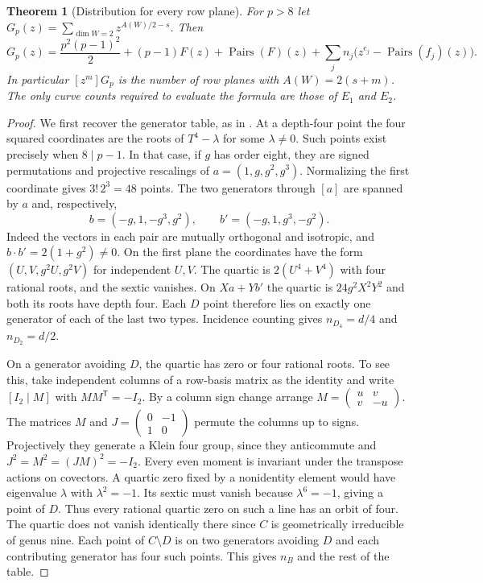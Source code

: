 \documentclass[11pt]{article}
\newtheorem{theorem}{Theorem}[section]
\newcommand{\sq}{\operatorname{Pairs}}
\begin{document}
\begin{theorem}[Distribution for every row plane]\label{th:all}
For $p>8$ let $G_p(z)=\sum_{\dim W=2}z^{A(W)/2-s}$. Then
\begin{equation}\label{eq:census}
 G_p(z)=\frac{p^2(p-1)^2}{2}+(p-1)F(z)+\sq(F)(z)
       +\sum_j n_j\big(z^{e_j}-\sq(f_j)(z)\big).
\end{equation}
In particular $[z^m]G_p$ is the number of row planes with
$A(W)=2(s+m)$. The only curve counts required to evaluate the
formula are those of $E_1$ and $E_2$.
\end{theorem}
\begin{proof}
We first recover the generator table, as in \cite{short}. At a
depth-four point the four squared coordinates are the roots of
$T^4-\lambda$ for some $\lambda\ne0$. Such points exist precisely
when $8\mid p-1$. In that case, if $g$ has order eight, they
are signed permutations and projective rescalings of
$a=(1,g,g^2,g^3)$. Normalizing the first coordinate gives
$3!\,2^3=48$ points. The two generators through $[a]$ are spanned
by $a$ and, respectively,
\[
 b=(-g,1,-g^3,g^2),\qquad b'=(-g,1,g^3,-g^2).
\]
Indeed the vectors in each pair are mutually orthogonal and isotropic,
and $b\cdot b'=2(1+g^2)\ne0$. On the first plane the coordinates
have the form $(U,V,g^2U,g^2V)$ for independent $U,V$. The quartic
is $2(U^4+V^4)$ with four rational roots, and the sextic vanishes.
On $Xa+Yb'$ the quartic is $24g^2X^2Y^2$ and both its roots
have depth four. Each $D$ point therefore lies on exactly one
generator of each of the last two types. Incidence counting gives
$n_{D_4}=d/4$ and $n_{D_2}=d/2$.

On a generator avoiding $D$, the quartic has zero or four rational
roots. To see this, take independent columns of a row-basis matrix
as the identity and write $[I_2\mid M]$ with $MM^{\mathsf T}=-I_2$.
By a column sign change arrange
$M=\left(\begin{smallmatrix}u&v\\v&-u\end{smallmatrix}\right)$.
The matrices $M$ and
$J=\left(\begin{smallmatrix}0&-1\\1&0\end{smallmatrix}\right)$
permute the columns up to signs. Projectively they generate a Klein
four group, since they anticommute and $J^2=M^2=(JM)^2=-I_2$.
Every even moment is invariant under the transpose actions on
covectors. A quartic zero fixed by a nonidentity element would have
eigenvalue $\lambda$ with $\lambda^2=-1$. Its sextic must vanish
because $\lambda^6=-1$, giving a point of $D$. Thus every rational
quartic zero on such a line has an orbit of four. The quartic does
not vanish identically there since $C$ is geometrically irreducible
of genus nine. Each point of $C\setminus D$ is on two generators
avoiding $D$ and each contributing generator has four such points.
This gives $n_B$ and the rest of the table.


\end{proof}
\end{document}
